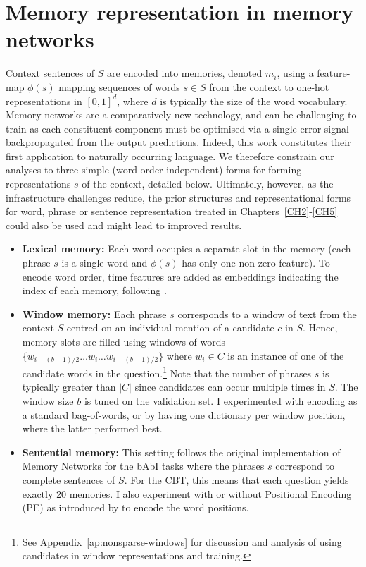 \section{Memory representation in memory networks}

\label{sec:memnn}

Context sentences of $S$ are encoded into memories, denoted $m_i$, using a feature-map \(\phi(s)\) mapping sequences of words \(s \in S\) from the context to one-hot representations in \([0,1]^d\), where $d$ is typically the size of the word vocabulary. Memory networks are a comparatively new technology, and can be challenging to train as each constituent component must be optimised via a single error signal backpropagated from the output predictions. Indeed, this work constitutes their first application to naturally occurring language. We therefore constrain our analyses to three simple (word-order independent) forms for forming representations \(s\) of the context, detailed below. Ultimately, however, as the infrastructure challenges reduce, the prior structures and representational forms for word, phrase or sentence representation treated in Chapters~\ref{CH2}-\ref{CH5} could also be used and might lead to improved results.

\begin{itemize}  %

\item {\bf Lexical memory:} Each word occupies a separate slot in the memory (each phrase \(s\) is a single word and \(\phi(s)\) has only one non-zero feature). To encode word order, time features are added as embeddings indicating the index of each memory, following \cite{sukhbaatar2015end}. 

\item {\bf Window memory:} Each phrase \(s\) corresponds to a window of text from the context $S$ centred on an individual mention of a candidate $c$ in $S$. Hence, memory slots are filled using windows of words \(\{ w_{i-(b-1)/2} \dots w_i \dots w_{i+(b-1)/2} \} \) where \(w_i\in C\) is an instance of one of the candidate words in the question.\footnote{See Appendix~\ref{ap:nonsparse-windows} for discussion and analysis of using candidates in window representations and training.} Note that the number of phrases \(s\) is typically greater than $|C|$ since candidates can occur multiple times in $S$. The window size \(b\) is tuned on the validation set. I experimented with encoding as a standard bag-of-words, or by having one dictionary per window position, where the latter performed best.

\item {\bf Sentential memory:} This setting follows the original implementation of Memory Networks for the bAbI tasks where the phrases \(s\) correspond to complete sentences of $S$.  For the CBT, this means that each question yields exactly 20 memories. I also experiment with or without Positional Encoding (PE) as introduced by \cite{sukhbaatar2015end} to encode the word positions. 
\end{itemize}

